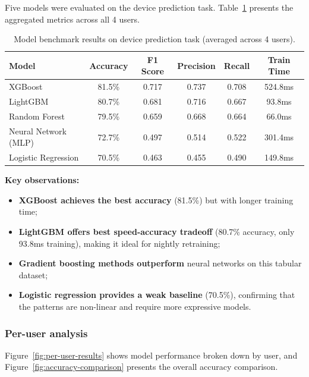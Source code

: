 Five models were evaluated on the device prediction task. Table~\ref{tab:benchmark-results}
presents the aggregated metrics across all 4 users.

\begin{table}[H]
    \centering
    \caption{Model benchmark results on device prediction task (averaged across 4 users).}
    \label{tab:benchmark-results}
    \renewcommand{\arraystretch}{1.3}
    \small
    \begin{tabular}{@{} l c c c c c @{}}
        \toprule
        \textbf{Model} & \textbf{Accuracy} & \textbf{F1 Score} & \textbf{Precision} & \textbf{Recall} & \textbf{Train Time} \\
        \midrule
        XGBoost & 81.5\% & 0.717 & 0.737 & 0.708 & 524.8ms \\
        LightGBM & 80.7\% & 0.681 & 0.716 & 0.667 & 93.8ms \\
        Random Forest & 79.5\% & 0.659 & 0.668 & 0.664 & 66.0ms \\
        Neural Network (MLP) & 72.7\% & 0.497 & 0.514 & 0.522 & 301.4ms \\
        Logistic Regression & 70.5\% & 0.463 & 0.455 & 0.490 & 149.8ms \\
        \bottomrule
    \end{tabular}
\end{table}

\textbf{Key observations:}
\begin{itemize}
    \item \textbf{XGBoost achieves the best accuracy} (81.5\%) but with longer training time;
    \item \textbf{LightGBM offers best speed-accuracy tradeoff} (80.7\% accuracy, only 93.8ms training),
    making it ideal for nightly retraining;
    \item \textbf{Gradient boosting methods outperform} neural networks on this tabular dataset;
    \item \textbf{Logistic regression provides a weak baseline} (70.5\%), confirming that
    the patterns are non-linear and require more expressive models.
\end{itemize}

\subsubsection{Per-user analysis}

Figure~\ref{fig:per-user-results} shows model performance broken down by user,
and Figure~\ref{fig:accuracy-comparison} presents the overall accuracy comparison.

